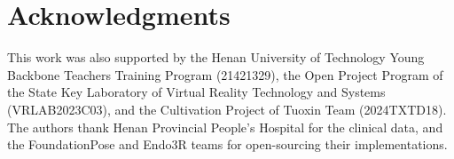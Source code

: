 \documentclass[9pt,twoside,web]{ieeecolor2}
\begin{document}
\section*{Acknowledgments}
This work was also supported by the Henan University of Technology Young Backbone Teachers Training Program (21421329), the Open Project Program of the State Key Laboratory of Virtual Reality Technology and Systems (VRLAB2023C03), and the Cultivation Project of Tuoxin Team (2024TXTD18). The authors thank Henan Provincial People's Hospital for the clinical data, and the FoundationPose and Endo3R teams for open-sourcing their implementations.

{\footnotesize\setlength{\itemsep}{0pt}\setlength{\parskip}{0pt}


}
\end{document}
